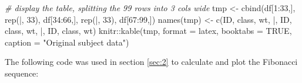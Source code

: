 \documentclass[smallextended]{svjour3}       %
\newenvironment{Shaded}{\begin{snugshade}}{\end{snugshade}}
\newcommand{\AttributeTok}[1]{\textcolor[rgb]{0.77,0.63,0.00}{#1}}
\newcommand{\CommentTok}[1]{\textcolor[rgb]{0.56,0.35,0.01}{\textit{#1}}}
\newcommand{\ConstantTok}[1]{\textcolor[rgb]{0.00,0.00,0.00}{#1}}
\newcommand{\DecValTok}[1]{\textcolor[rgb]{0.00,0.00,0.81}{#1}}
\newcommand{\FunctionTok}[1]{\textcolor[rgb]{0.00,0.00,0.00}{#1}}
\newcommand{\NormalTok}[1]{#1}
\newcommand{\OtherTok}[1]{\textcolor[rgb]{0.56,0.35,0.01}{#1}}
\newcommand{\SpecialCharTok}[1]{\textcolor[rgb]{0.00,0.00,0.00}{#1}}
\newcommand{\StringTok}[1]{\textcolor[rgb]{0.31,0.60,0.02}{#1}}
\begin{document}
\begin{Shaded}
\begin{Highlighting}[]
\CommentTok{\# display the table, splitting the 99 rows into 3 cols wide}
\NormalTok{tmp }\OtherTok{\textless{}{-}} \FunctionTok{cbind}\NormalTok{(df[}\DecValTok{1}\SpecialCharTok{:}\DecValTok{33}\NormalTok{,], }\FunctionTok{rep}\NormalTok{(}\StringTok{\textquotesingle{}|\textquotesingle{}}\NormalTok{, }\DecValTok{33}\NormalTok{), }
\NormalTok{             df[}\DecValTok{34}\SpecialCharTok{:}\DecValTok{66}\NormalTok{,], }\FunctionTok{rep}\NormalTok{(}\StringTok{\textquotesingle{}|\textquotesingle{}}\NormalTok{, }\DecValTok{33}\NormalTok{), }
\NormalTok{             df[}\DecValTok{67}\SpecialCharTok{:}\DecValTok{99}\NormalTok{,])}
\FunctionTok{names}\NormalTok{(tmp) }\OtherTok{\textless{}{-}} \FunctionTok{c}\NormalTok{(}\StringTok{\textquotesingle{}ID\textquotesingle{}}\NormalTok{, }\StringTok{\textquotesingle{}class\textquotesingle{}}\NormalTok{, }\StringTok{\textquotesingle{}wt\textquotesingle{}}\NormalTok{, }\StringTok{\textquotesingle{}|\textquotesingle{}}\NormalTok{, }\StringTok{\textquotesingle{}ID\textquotesingle{}}\NormalTok{, }\StringTok{\textquotesingle{}class\textquotesingle{}}\NormalTok{, }\StringTok{\textquotesingle{}wt\textquotesingle{}}\NormalTok{, }
                \StringTok{\textquotesingle{}|\textquotesingle{}}\NormalTok{, }\StringTok{\textquotesingle{}ID\textquotesingle{}}\NormalTok{, }\StringTok{\textquotesingle{}class\textquotesingle{}}\NormalTok{, }\StringTok{\textquotesingle{}wt\textquotesingle{}}\NormalTok{)}
\NormalTok{knitr}\SpecialCharTok{::}\FunctionTok{kable}\NormalTok{(tmp, }\AttributeTok{format =} \StringTok{\textquotesingle{}latex\textquotesingle{}}\NormalTok{, }\AttributeTok{booktabs =} \ConstantTok{TRUE}\NormalTok{, }
             \AttributeTok{caption =} \StringTok{"Original subject data"}\NormalTok{)}
\end{Highlighting}
\end{Shaded}

The following code was used in section \ref{sec:2} to calculate and plot the Fibonacci sequence:
\end{document}
